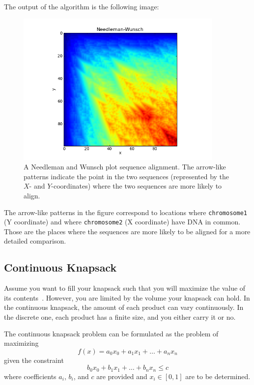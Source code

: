 \documentclass[justified,sixbynine]{tufte-book}
\def\ft{\small\tt}
\theoremstyle{plain}%
\theoremstyle{definition}
\theoremstyle{remark}
\begin{document}
\begin{fullwidth}
The output of the algorithm is the following image:

\begin{figure}[ht]
\centering\includegraphics[width=4in]{images/needleman.png}
\caption{A Needleman and Wunsch plot sequence alignment. The arrow-like patterns indicate the point in the two sequences (represented by the $X$- and $Y$-coordinates) where the two sequences are more likely to align.}
\end{figure}

The arrow-like patterns in the figure correspond to locations where {\ft chromosome1} (Y coordinate) and where {\ft chromosome2} (X coordinate) have DNA in common. Those are the places where the sequences are more likely to be aligned for a more detailed comparison.

\subsection{Continuous Knapsack}

Assume you want to fill your knapsack such that you will maximize the value of its contents~\cite{knapsack}.  However, you are limited by the volume your knapsack can hold. In the continuous knapsack, the amount of each product can vary continuously. In the discrete one, each product has a finite size, and you either carry it or no.

The continuous knapsack problem can be formulated as the problem of
maximizing
\begin{equation}
f(x)=a_0x_0+a_1x_1+\dots+a_nx_n
\end{equation}
given the constraint
\begin{equation}
b_0x_0+b_1x_1+\dots+b_nx_n\leq c
\end{equation}
where coefficients $a_i$, $b_i$, and $c$ are provided and $x_i\in [0,1]$ are
to be determined.


\end{fullwidth}
\end{document}
